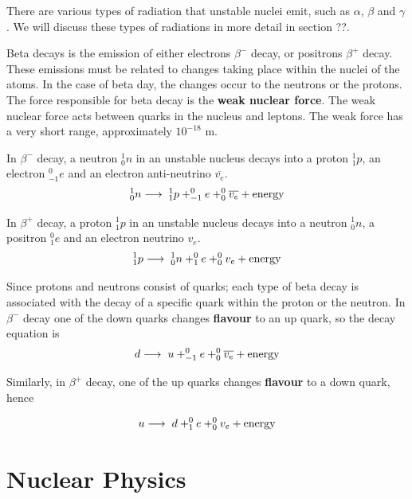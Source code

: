 There are various types of radiation that unstable nuclei emit, such as $\alpha$, $\beta$ and $\gamma$. We will discuss these types of radiations in more detail in section ??.

Beta decays is the emission of either electrons $\beta^-$ decay, or positrons $\beta^+$ decay. These emissions must be related to changes taking place within the nuclei of the atoms. In the case of beta day, the changes occur to the neutrons or the protons. The force responsible for beta decay is the \textbf{weak nuclear force}. The weak nuclear force acts between quarks in the nucleus and leptons. The weak force has a very short range, approximately $10^{-18}$ m.

In $\beta^-$ decay, a neutron $_0^1 n$ in an unstable nucleus decays into a proton $_1^1 p$, an electron $_{-1}^0 e$ and an electron anti-neutrino $\overline{v_e}$. 
\begin{equation}
    _0^1 n \longrightarrow \hspace{1mm} _1^1 p + _{-1}^{0} e + _0^0 \overline{v_e} + \text{energy}
\end{equation}


In $\beta^+$ decay, a proton $_1^1 p$ in an unstable nucleus decays into a neutron $_0^1 n$, a positron $_{1}^0 e$ and an electron neutrino $v_e$. 
\begin{equation}
    _1^1 p \longrightarrow \hspace{1mm} _0^1 n + _{1}^{0} e + _0^0 v_e + \text{energy}
\end{equation}

Since protons and neutrons consist of quarks; each type of beta decay is associated with the decay of a specific quark within the proton or the neutron. In $\beta^-$ decay one of the down quarks changes \textbf{flavour} to an up quark, so the decay equation is
\begin{equation}
    d \longrightarrow \hspace{1mm} u + _{-1}^{0} e + _0^0 \overline{v_e} + \text{energy}
\end{equation}

Similarly, in $\beta^+$ decay, one of the up quarks changes \textbf{flavour} to a down quark, hence 

\begin{equation}
    u \longrightarrow \hspace{1mm} d + _{1}^{0} e + _0^0 v_e + \text{energy}
\end{equation}

\section{Nuclear Physics}


